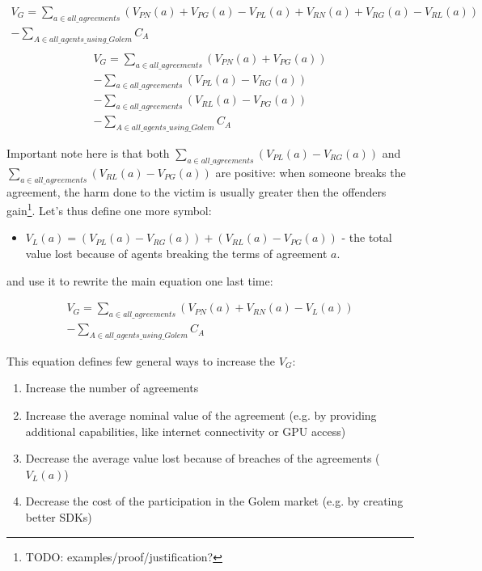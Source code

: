 \documentclass{article}
\begin{document}
\begin{equation}
\begin{split}
    V_G = \sum_{a \in all\_agreements}(V_{PN}(a) + V_{PG}(a) - V_{PL}(a) + V_{RN}(a) + V_{RG}(a) - V_{RL}(a)) \\
            - \sum_{A \in all\_agents\_using\_Golem}C_A \\
\end{split}
\end{equation}
\begin{equation}
\begin{split}
    V_G = \sum_{a \in all\_agreements}(V_{PN}(a) + V_{PG}(a)) \\
          - \sum_{a \in all\_agreements}(V_{PL}(a)- V_{RG}(a)) \\
          - \sum_{a \in all\_agreements}(V_{RL}(a)- V_{PG}(a)) \\
          - \sum_{A \in all\_agents\_using\_Golem}C_A
\end{split}
\end{equation}

Important note here is that both $\sum_{a \in all\_agreements}(V_{PL}(a)- V_{RG}(a))$ and $\sum_{a \in all\_agreements}(V_{RL}(a)- V_{PG}(a))$ are positive: 
when someone breaks the agreement, the harm done to the victim is usually greater then the offenders gain\footnote{TODO: examples/proof/justification?}.
Let's thus define one more symbol:
\begin{itemize}
\item $V_L(a) = (V_{PL}(a)- V_{RG}(a)) + (V_{RL}(a)- V_{PG}(a))$ - the total value lost because of agents breaking the terms of agreement $a$.
\end{itemize}
and use it to rewrite the main equation one last time:

\begin{equation}
\begin{split}
    V_G = \sum_{a \in all\_agreements}(V_{PN}(a) + V_{RN}(a) - V_L(a)) \\
          - \sum_{A \in all\_agents\_using\_Golem}C_A
\end{split}
\end{equation}

This equation defines few general ways to increase the $V_G$:

\begin{enumerate}
\item Increase the number of agreements
\item Increase the average nominal value of the agreement (e.g. by providing additional capabilities, like internet connectivity or GPU access)
\item Decrease the average value lost because of breaches of the agreements ($V_L(a)$)
\item Decrease the cost of the participation in the Golem market (e.g. by creating better SDKs)
\end{enumerate}
\end{document}
